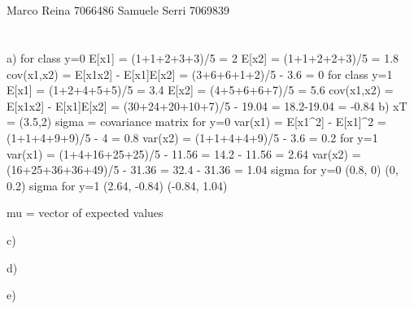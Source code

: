 \documentclass[12pt]{article}
\begin{document}
\section*{}
Marco Reina 7066486 \newline
Samuele Serri 7069839 \newline
\section*{}

a)
for class y=0
E[x1] = (1+1+2+3+3)/5 = 2
E[x2] = (1+1+2+2+3)/5 = 1.8
cov(x1,x2) = E[x1x2] - E[x1]E[x2] = (3+6+6+1+2)/5 - 3.6 = 0
for class y=1
E[x1] = (1+2+4+5+5)/5 = 3.4
E[x2] = (4+5+6+6+7)/5 = 5.6
cov(x1,x2) = E[x1x2] - E[x1]E[x2] = (30+24+20+10+7)/5 - 19.04 = 18.2-19.04 = -0.84
b)
xT = (3.5,2)
sigma = covariance matrix
for y=0
var(x1) = E[x1^2] - E[x1]^2 = (1+1+4+9+9)/5 - 4 = 0.8
var(x2) = (1+1+4+4+9)/5 - 3.6 = 0.2
for y=1
var(x1) = (1+4+16+25+25)/5 - 11.56 = 14.2 - 11.56 = 2.64
var(x2) = (16+25+36+36+49)/5 - 31.36 = 32.4 - 31.36 = 1.04
sigma for y=0
(0.8, 0)
(0, 0.2)
sigma for y=1
(2.64, -0.84)
(-0.84, 1.04)

mu = vector of expected values

c)


d)


e)
\end{document}
